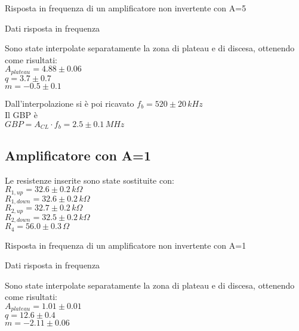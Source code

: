 \begin{grafico}
 \centering 
  
 \caption{Risposta in frequenza di un amplificatore non invertente con A=5} 
 \label{gr:amp_noninv_A5.tex} 
\end{grafico}

\begin{tabella}
 \centering
   
 \caption{Dati risposta in frequenza}
 \label{tab:tab_noninv_A5.tex}
\end{tabella}

Sono state interpolate separatamente la zona di plateau e di discesa, ottenendo come risultati:\\
$A_{plateau}=4.88 \pm 0.06$\\
$q = 3.7 \pm 0.7$\\
$m = -0.5 \pm 0.1$

Dall'interpolazione si è poi ricavato 
$f_b= 520 \pm 20 \,kHz $\\
Il GBP è\\
$GBP=A_{CL} \cdot f_b = 2.5 \pm 0.1 \,MHz$


\subsection{Amplificatore con A=1}
Le resistenze inserite sono state sostituite con:\\
$R_{1,up}=32.6 \pm 0.2 \,k\Omega $\\ %
$R_{1,down}=32.6 \pm 0.2\,k\Omega$\\ %
$R_{2,up}=32.7 \pm 0.2\,k\Omega$\\ %
$R_{2,down}=32.5 \pm 0.2\,k\Omega$\\
$R_4=56.0 \pm 0.3\,\Omega$
\begin{grafico}
 \centering 
  
 \caption{Risposta in frequenza di un amplificatore non invertente con A=1} 
 \label{gr:amp_noninv_A1.tex} 
\end{grafico}

\begin{tabella}
 \centering
  
 \caption{Dati risposta in frequenza}
 \label{tab:tab_noninv_A1.tex}
\end{tabella}

Sono state interpolate separatamente la zona di plateau e di discesa, ottenendo come risultati:\\
$A_{plateau}=1.01 \pm 0.01$\\
$q = 12.6 \pm 0.4$\\
$m  = -2.11 \pm 0.06$

